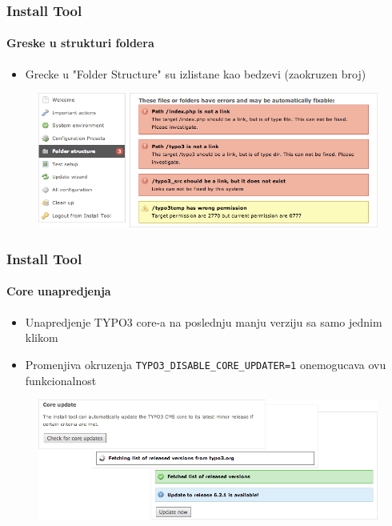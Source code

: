 
\begin{frame}[fragile]
	\frametitle{Install Tool}
	\framesubtitle{Greske u strukturi foldera}

	\begin{itemize}
		\item Grecke u "Folder Structure" su izlistane kao bedzevi (zaokruzen broj)
	\end{itemize}

	\begin{figure}
		\includegraphics[width=0.95\linewidth]{Images/InstallTool/ErrorsInFolderStructure.png}
	\end{figure}

\end{frame}


\begin{frame}[fragile]
	\frametitle{Install Tool}
	\framesubtitle{Core unapredjenja}

	\begin{itemize}
		\item Unapredjenje TYPO3 core-a na poslednju manju verziju sa samo jednim klikom
		\item Promenjiva okruzenja \texttt{TYPO3\_DISABLE\_CORE\_UPDATER=1} onemogucava ovu funkcionalnost
	\end{itemize}

	\begin{figure}
		\includegraphics[width=0.95\linewidth]{Images/InstallTool/CoreUpdate.png}
	\end{figure}

\end{frame}

